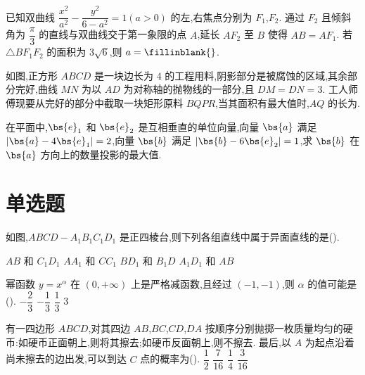 \begin{problem}
已知双曲线 \(\dfrac{x^2}{a^2}-\dfrac{y^2}{6-a^2}=1(a>0)\) 的左,右焦点分别为 \(F_1\),\(F_2\). 通过 \(F_2\) 且倾斜角为 \(\dfrac\pi3\) 的直线与双曲线交于第一象限的点 \(A\),延长 \(AF_2\) 至 \(B\) 使得 \(AB=AF_1\). 若 \(\triangle BF_1F_2\) 的面积为 \(3\sqrt6\),则 \(a=\fillinblank{}\).
\end{problem}

\begin{problem}
如图,正方形 \(ABCD\) 是一块边长为 \(4\) 的工程用料,阴影部分是被腐蚀的区域,其余部分完好,曲线 \(MN\) 为以 \(AD\) 为对称轴的抛物线的一部分,且 \(DM=DN=3\). 工人师傅现要从完好的部分中截取一块矩形原料 \(BQPR\),当其面积有最大值时,\(AQ\) 的长为\fillinblank{}.

\end{problem}

\begin{problem}
在平面中,\(\bs{e}_1\) 和 \(\bs{e}_2\) 是互相垂直的单位向量,向量 \(\bs{a}\) 满足 \(|\bs{a}-4\bs{e}_1|=2\),向量 \(\bs{b}\) 满足 \(|\bs{b}-6\bs{e}_2|=1\),求 \(\bs{b}\) 在 \(\bs{a}\) 方向上的数量投影的最大值\fillinblank{}.
\end{problem}

\section{单选题}

\begin{problem}
如图,\(ABCD-A_1B_1C_1D_1\) 是正四棱台,则下列各组直线中属于异面直线的是(\quad).

\choices
    {\(AB\) 和 \(C_1D_1\)}
    {\(AA_1\) 和 \(CC_1\)}
    {\(BD_1\) 和 \(B_1D\)}
    {\(A_1D_1\) 和 \(AB\)}
\end{problem}

\begin{problem}
幂函数 \(y=x^\alpha\) 在 \((0,+\infty)\) 上是严格减函数,且经过 \((-1,-1)\),则 \(\alpha\) 的值可能是(\quad).
\choices
    {\(-\dfrac23\)}
    {\(-\dfrac13\)}
    {\(\dfrac13\)}
    {\(3\)}
\end{problem}

\begin{problem}
有一四边形 \(ABCD\),对其四边 \(AB\),\(BC\),\(CD\),\(DA\) 按顺序分别抛掷一枚质量均匀的硬币:如硬币正面朝上,则将其擦去;如硬币反面朝上,则不擦去. 最后,以 \(A\) 为起点沿着尚未擦去的边出发,可以到达 \(C\) 点的概率为(\quad).
\choices
    {\(\dfrac12\)}
    {\(\dfrac7{16}\)}
    {\(\dfrac14\)}
    {\(\dfrac3{16}\)}
\end{problem}

